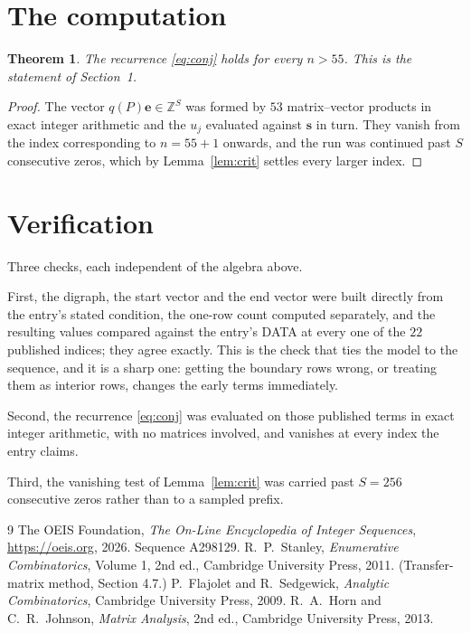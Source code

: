 \documentclass[11pt,a4paper]{article}
\theoremstyle{plain}
\newtheorem{theorem}{Theorem}
\theoremstyle{definition}
\begin{document}
\section{The computation}

\begin{theorem}
The recurrence \eqref{eq:conj} holds for every $n>55$. This is the statement of
Section~1.
\end{theorem}

\begin{proof}
The vector $q(P)\mathbf{e}\in\mathbb{Z}^{S}$ was formed by $53$ matrix--vector
products in exact integer arithmetic and the $u_j$ evaluated against $\mathbf{s}$ in turn.
They vanish from the index corresponding to $n=55+1$ onwards, and the run was continued
past $S$ consecutive zeros, which by Lemma~\ref{lem:crit} settles every larger index.
\end{proof}

\section{Verification}

Three checks, each independent of the algebra above.

First, the digraph, the start vector and the end vector were built directly from the
entry's stated condition, the one-row count computed separately, and the resulting values
compared against the entry's DATA at every one of the $22$ published indices; they
agree exactly. This is the check that ties the model to the sequence, and it is a sharp one:
getting the boundary rows wrong, or treating them as interior rows, changes the early terms
immediately.

Second, the recurrence \eqref{eq:conj} was evaluated on those published terms in exact
integer arithmetic, with no matrices involved, and vanishes at every index the entry claims.

Third, the vanishing test of Lemma~\ref{lem:crit} was carried past $S=256$ consecutive
zeros rather than to a sampled prefix.

\begin{thebibliography}{9}
 The OEIS Foundation, \emph{The On-Line Encyclopedia of Integer
Sequences}, \url{https://oeis.org}, 2026. Sequence A298129.
 R.~P.~Stanley, \emph{Enumerative Combinatorics}, Volume 1, 2nd ed.,
Cambridge University Press, 2011. (Transfer-matrix method, Section 4.7.)
 P.~Flajolet and R.~Sedgewick, \emph{Analytic Combinatorics}, Cambridge
University Press, 2009.
 R.~A.~Horn and C.~R.~Johnson, \emph{Matrix Analysis}, 2nd ed., Cambridge
University Press, 2013.
\end{thebibliography}
\end{document}
